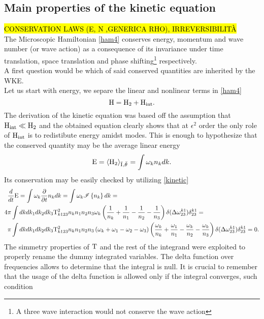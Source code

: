 \subsection{Main properties of the kinetic equation}
\hl{CONSERVATION LAWS (E, N ,GENERICA RHO), IRREVERSIBILITÀ}\\
The Microscopic Hamiltonian \eqref{ham4} conserves energy, momentum and wave number (or wave action) as a consequence of its invariance under time translation,
space translation and phase shifting\footnote{A three wave interaction would not conserve the wave action} respectively. \\
A first question would be which of said conserved quantities are inherited by the WKE.\\
Let us start with energy, we separe the linear and nonlinear terms in \eqref{ham4}
\begin{equation}
    \mathrm{H} = \mathrm{H}_2 + \mathrm{H}_{\text{int}}.
\end{equation}
The derivation of the kinetic equation was based off the assumption that $\mathrm{H}_{\text{int}} \ll \mathrm{H}_{2}$ and the obtained equation clearly shows that at $\epsilon^2$ 
order the only role of $\mathrm{H}_{\text{int}}$ is to redistibute energy amidst modes. This is enough to hypothesize that the conserved quantity may be the average linear energy
\begin{equation}
    \mathrm{E} = \left\langle \mathrm{H}_2 \right\rangle_{\bar{\mathrm{I}^{}},\bar{\theta}^{}} = \int \omega_k n_k dk.
\end{equation}
Its conservation may be easily checked by utilizing \eqref{kinetic} 
\begin{align}
    &\frac{d}{dt} \mathrm{E} = \int \omega_k \frac{\partial}{\partial t} n_k dk = \int \omega_k \mathscr{I}\left\{n_k\right\} dk = \label{encons}\\
    4 &\pi\int  dk dk_1 dk_2 dk_3 
    \mathrm{T}^2_{k123}n_kn_1n_2n_3 \omega_k
    \left(\frac{1}{n_k} + \frac{1}{n_1} - \frac{1}{n_2}- \frac{1}{n_3}  \right)
    \delta(\Delta{\omega}^{k1}_{23})\delta^{k1}_{23} = \\
    &\pi\int  dk dk_1 dk_2 dk_3 
    \mathrm{T}^2_{k123}n_kn_1n_2n_3\left(\omega_k + \omega_1 - \omega_2 - \omega_3\right)
    \left(\frac{\omega_k}{n_k} + \frac{\omega_1}{n_1} - \frac{\omega_k}{n_2}- \frac{\omega_k}{n_3}  \right)
    \delta(\Delta{\omega}^{k1}_{23})\delta^{k1}_{23} = 0.    
\end{align}
The simmetry properties of $\mathrm{T}$ and the rest of the integrand were exploited to properly rename the dummy integrated variables. The delta function over frequencies 
allows to determine that the integral is null. It is crucial to remember that the usage of the delta function is allowed only if the integral converges, such condition
